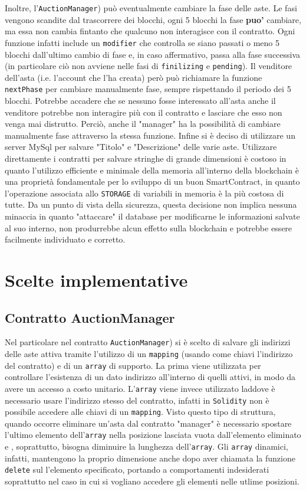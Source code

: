 Inoltre, l'\texttt{AuctionManager}) può eventualmente cambiare la fase delle aste. Le fasi vengono scandite dal trascorrere dei blocchi, ogni 5 blocchi la fase \textbf{puo'} cambiare, ma essa non cambia fintanto che qualcuno non interagisce con il contratto. Ogni funzione infatti include un \texttt{modifier} che controlla se siano passati o meno 5 blocchi dall'ultimo cambio di fase e, in caso affermativo, passa alla fase successiva (in particolare ciò non avviene nelle fasi di \texttt{finilizing} e \texttt{pending}). Il venditore dell'asta (i.e. l'account che l'ha creata) però può richiamare la funzione \texttt{nextPhase} per cambiare manualmente fase, sempre rispettando il periodo dei 5 blocchi. Potrebbe accadere che se nessuno fosse interessato all'asta anche il venditore potrebbe non interagire più con il contratto e lasciare che esso non venga mai distrutto. Perciò, anche il "manager" ha la possibilità di cambiare manualmente fase attraverso la stessa funzione.\newline
Infine si è deciso di utilizzare un server MySql per salvare "Titolo" e "Descrizione" delle varie aste. Utilizzare direttamente i contratti per salvare stringhe di grande dimensioni è costoso in quanto l'utilizzo efficiente e minimale della memoria all'interno della blockchain è una proprietà fondamentale per lo sviluppo di un buon SmartContract, in quanto l'operazione associata allo \texttt{STORAGE} di variabili in memoria è la più costosa di tutte. Da un punto di vista della sicurezza, questa decisione non implica nessuna minaccia in quanto "attaccare" il database per modificarne le informazioni salvate al suo interno, non produrrebbe alcun effetto sulla blockchain e potrebbe essere facilmente individuato e corretto.
\section{Scelte implementative}
\subsection{Contratto AuctionManager}
Nel particolare nel contratto \texttt{AuctionManager}) si è scelto di salvare gli indirizzi delle aste attiva tramite l'utilizzo di un \texttt{mapping} (usando come chiavi l'indirizzo del contratto) e di un \texttt{array} di supporto. La prima viene utilizzata per controllare l'esistenza di un dato indirizzo all'interno di quelli attivi, in modo da avere un accesso a costo unitario. L'\texttt{array} viene invece utilizzato laddove è necessario usare l'indirizzo stesso del contratto, infatti in \texttt{Solidity} non è possibile accedere alle chiavi di un \texttt{mapping}. Visto questo tipo di struttura, quando occorre eliminare un'asta dal contratto "manager" è necessario spostare l'ultimo elemento dell'\texttt{array} nella posizione lasciata vuota dall'elemento eliminato e , soprattutto, bisogna diminuire la lunghezza dell'\texttt{array}. Gli \texttt{array} dinamici, infatti, mantengono la proprio dimensione anche dopo aver chiamata la funzione \texttt{delete} sul l'elemento specificato, portando a comportamenti indesiderati soprattutto nel caso in cui si vogliano accedere gli elementi nelle utlime posizioni.\newline
